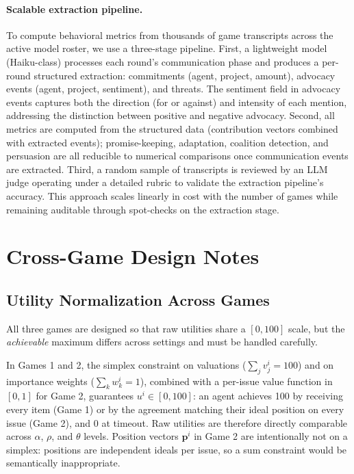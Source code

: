 \paragraph{Scalable extraction pipeline.}
To compute behavioral metrics from thousands of game transcripts across the active model roster, we use a three-stage pipeline.
First, a lightweight model (Haiku-class) processes each round's communication phase and produces a per-round structured extraction: commitments (agent, project, amount), advocacy events (agent, project, sentiment), and threats.
The sentiment field in advocacy events captures both the direction (for or against) and intensity of each mention, addressing the distinction between positive and negative advocacy.
Second, all metrics are computed from the structured data (contribution vectors combined with extracted events); promise-keeping, adaptation, coalition detection, and persuasion are all reducible to numerical comparisons once communication events are extracted.
Third, a random sample of transcripts is reviewed by an LLM judge operating under a detailed rubric to validate the extraction pipeline's accuracy.
This approach scales linearly in cost with the number of games while remaining auditable through spot-checks on the extraction stage.

\section{Cross-Game Design Notes}
\label{sec:cross_game_notes}

\subsection{Utility Normalization Across Games}
\label{sec:normalization}

All three games are designed so that raw utilities share a $[0, 100]$ scale, but the \emph{achievable} maximum differs across settings and must be handled carefully.

In Games 1 and 2, the simplex constraint on valuations ($\sum_j v^i_j = 100$) and on importance weights ($\sum_k w^i_k = 1$), combined with a per-issue value function in $[0,1]$ for Game 2, guarantees $u^i \in [0, 100]$: an agent achieves 100 by receiving every item (Game 1) or by the agreement matching their ideal position on every issue (Game 2), and 0 at timeout.
Raw utilities are therefore directly comparable across $\alpha$, $\rho$, and $\theta$ levels.
Position vectors $\bm{p}^i$ in Game 2 are intentionally not on a simplex: positions are independent ideals per issue, so a sum constraint would be semantically inappropriate.

